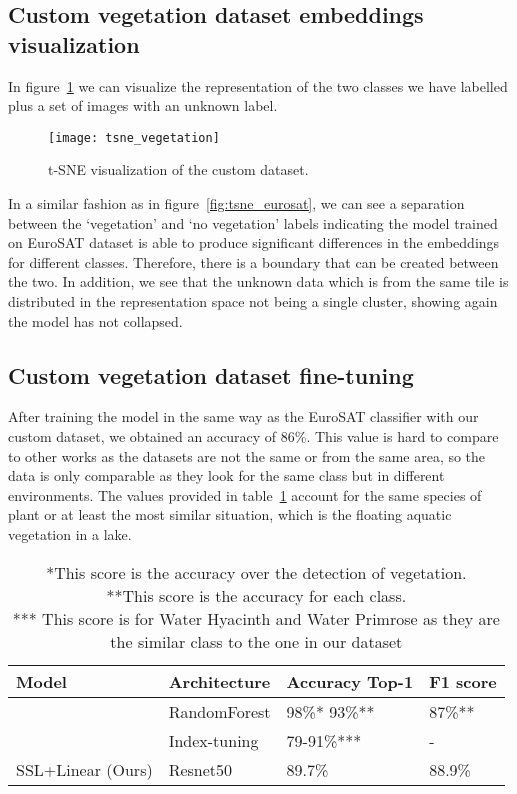 \documentclass[conference]{IEEEtran}
\begin{document}
    \subsection{Custom vegetation dataset embeddings visualization}
    In figure~\ref{fig:tsne_vegetation} we can visualize the representation of the two classes we have labelled plus a set of images
    with an unknown label.

    \begin{figure}[t]
        \centering
        \texttt{[image: tsne\_vegetation]}
        \caption{t-SNE visualization of the custom dataset.}
        \label{fig:tsne_vegetation}
    \end{figure}

    In a similar fashion as in figure~\ref{fig:tsne_eurosat}, we can see a separation between the `vegetation' and `no vegetation' labels
    indicating the model trained on EuroSAT dataset is able to produce significant differences in the embeddings for different classes.
    Therefore, there is a boundary that can be created between the two.
    In addition, we see that the unknown data which is from the same tile is distributed in the representation space not being a single cluster,
    showing again the model has not collapsed.

    \subsection{Custom vegetation dataset fine-tuning}
    After training the model in the same way as the EuroSAT classifier with our custom dataset, we obtained an accuracy of 86\%.
    This value is hard to compare to other works as the datasets are not the same or from the same area, so the data is only comparable as they look for the same
    class but in different environments.
    The values provided in table~\ref{table:vegetation_results} account for the same species of plant or at least the most similar situation,
    which is the floating aquatic vegetation in a lake.
    \begin{table}[h!]
        \centering
        \begin{tabular}{ |p{2.2cm}||p{1.5cm}|p{2.2cm}|p{1cm}|}
            \hline
            Model              & Architecture & Accuracy Top-1 & F1 score \\
            \hline
            \hline
            \citet{rs12244021} & RandomForest & 98\%* 93\%**   & 87\%**   \\
            \citet{rs14133013} & Index-tuning & 79-91\%***     & -        \\
            SSL+Linear (Ours)  & Resnet50     & 89.7\%         & 88.9\%   \\
            \hline
        \end{tabular}
        \caption{
            *This score is the accuracy over the detection of vegetation. \\
            **This score is the accuracy for each class. \\
            *** This score is for Water Hyacinth and Water Primrose as they are the similar class to the one in our dataset}
        \label{table:vegetation_results}
    \end{table}
\end{document}
